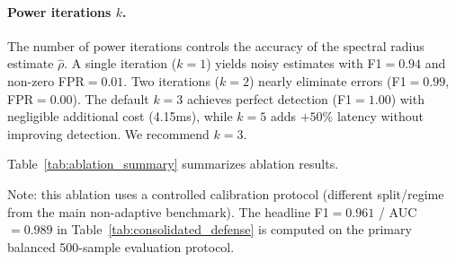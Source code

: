 \documentclass[10pt,twocolumn]{article}
\begin{document}
\paragraph{Power iterations $k$.}
The number of power iterations controls the accuracy of the spectral radius estimate $\hat{\rho}$. A single iteration ($k{=}1$) yields noisy estimates with F1$=0.94$ and non-zero FPR$=0.01$. Two iterations ($k{=}2$) nearly eliminate errors (F1$=0.99$, FPR$=0.00$). The default $k{=}3$ achieves perfect detection (F1$=1.00$) with negligible additional cost (4.15ms), while $k{=}5$ adds $+50\%$ latency without improving detection. We recommend $k{=}3$.


Table~\ref{tab:ablation_summary} summarizes ablation results.

\begin{table}[t]
\centering
\caption{Ablation: SpectralGuard Hyperparameters. The ``Rec.'' column marks the recommended default setting for each hyperparameter.}
\label{tab:ablation_summary}
\small
{}
\vspace{2pt}
\begin{minipage}{\columnwidth}
{\footnotesize Note: this ablation uses a controlled calibration protocol (different split/regime from the main non-adaptive benchmark). The headline F1$=0.961$ / AUC$=0.989$ in Table~\ref{tab:consolidated_defense} is computed on the primary balanced 500-sample evaluation protocol.}
\end{minipage}
\end{table}
\end{document}
